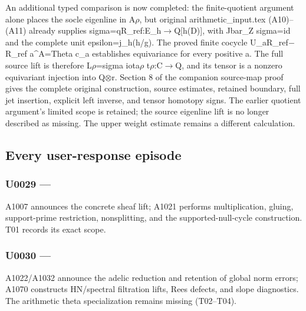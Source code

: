 An additional typed comparison is now completed: the finite-quotient
argument alone places the socle eigenline in
A\allowbreak{}\ensuremath{ρ}\allowbreak{}, but original
arithmetic\_input.tex (A10)--(A11) already supplies
sigma=qR\_ref:E\_h\allowbreak{}\ensuremath{→}\allowbreak{}Q[h(D)], with
Jbar\_Z sigma=id and the complete unit epsilon=j\_h(h/g). The proved
finite cocycle U\_aR\_ref\allowbreak{}\ensuremath{−}\allowbreak{}R\_ref
a\^{}A=Theta c\_a establishes equivariance for every positive a. The
full source lift is therefore
L\allowbreak{}\ensuremath{ρ}\allowbreak{}=sigma
iota\allowbreak{}\ensuremath{ρ}\allowbreak{}
t\allowbreak{}\ensuremath{ρ}\allowbreak{}:C\allowbreak{}\ensuremath{→}\allowbreak{}Q,
and its tensor is a nonzero equivariant injection into
Q\allowbreak{}\ensuremath{⊗}\allowbreak{}r. Section 8 of the companion
source-map proof gives the complete original construction, source
estimates, retained boundary, full jet insertion, explicit left inverse,
and tensor homotopy signs. The earlier quotient argument's limited scope
is retained; the source eigenline lift is no longer described as
missing. The upper weight estimate remains a different calculation.

\subsection{Every user-response
episode}\label{TranscriptLedgerStage:every-user-response-episode}

\subsubsection{\texorpdfstring{U0029 ---
\protect{}}{U0029 --- }}\label{TranscriptLedgerStage:u0029-53352f69-6c38-4cab-a6aa-c225647ebe9a}

A1007 announces the concrete sheaf lift; A1021 performs multiplication,
gluing, support-prime restriction, nonsplitting, and the
supported-null-cycle construction. T01 records its exact scope.

\subsubsection{\texorpdfstring{U0030 ---
\protect{}}{U0030 --- }}\label{TranscriptLedgerStage:u0030-2e3cac15-6cbf-4fbd-b826-ceed04867399}

A1022/A1032 announce the adelic reduction and retention of global norm
errors; A1070 constructs HN/spectral filtration lifts, Rees defects, and
slope diagnostics. The arithmetic theta specialization remains missing
(T02--T04).

